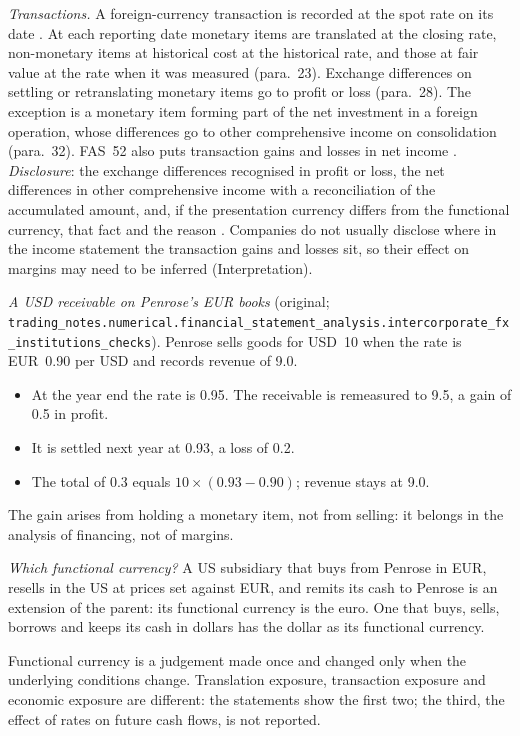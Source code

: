 \begin{qfdefinition}
\emph{Transactions.} A foreign-currency transaction is recorded at the spot rate on its date \citep[para.~21]{eu-2023-1803-ias21}. At each reporting date monetary items are translated at the closing rate, non-monetary items at historical cost at the historical rate, and those at fair value at the rate when it was measured (para.~23). Exchange differences on settling or retranslating monetary items go to profit or loss (para.~28). The exception is a monetary item forming part of the net investment in a foreign operation, whose differences go to other comprehensive income on consolidation (para.~32). FAS~52 also puts transaction gains and losses in net income \citep[para.~15]{us-foreign-currency-1981}. \emph{Disclosure}: the exchange differences recognised in profit or loss, the net differences in other comprehensive income with a reconciliation of the accumulated amount, and, if the presentation currency differs from the functional currency, that fact and the reason \citep[paras.~52--53]{eu-2023-1803-ias21}. Companies do not usually disclose where in the income statement the transaction gains and losses sit, so their effect on margins may need to be inferred (Interpretation).

 \emph{A USD receivable on Penrose's EUR books} (original; \nolinkurl{trading_notes.numerical.financial_statement_analysis.intercorporate_fx_institutions_checks}). Penrose sells goods for USD~10 when the rate is EUR~0.90 per USD and records revenue of 9.0.
\begin{itemize}
\item At the year end the rate is 0.95. The receivable is remeasured to 9.5, a gain of 0.5 in profit.
\item It is settled next year at 0.93, a loss of 0.2.
\item The total of 0.3 equals $10\times(0.93-0.90)$; revenue stays at 9.0.
\end{itemize}
The gain arises from holding a monetary item, not from selling: it belongs in the analysis of financing, not of margins.

\emph{Which functional currency?} A US subsidiary that buys from Penrose in EUR, resells in the US at prices set against EUR, and remits its cash to Penrose is an extension of the parent: its functional currency is the euro. One that buys, sells, borrows and keeps its cash in dollars has the dollar as its functional currency.

 Functional currency is a judgement made once and changed only when the underlying conditions change. Translation exposure, transaction exposure and economic exposure are different: the statements show the first two; the third, the effect of rates on future cash flows, is not reported.


\end{qfdefinition}

